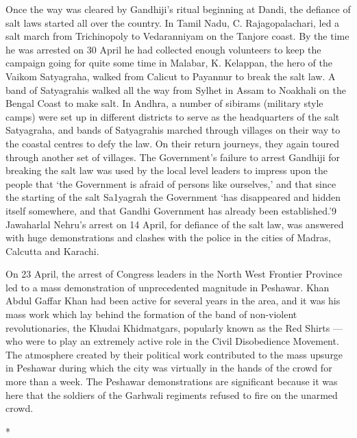Once the way was cleared by Gandhiji's ritual beginning at Dandi, the defiance of salt laws started all over the country. In Tamil Nadu, C. Rajagopalachari, led a salt march from Trichinopoly to Vedaranniyam on the Tanjore coast. By the time he was arrested on 30 April he had collected enough volunteers to keep the campaign going for quite some time in Malabar, K. Kelappan, the hero of the Vaikom Satyagraha, walked from Calicut to Payannur to break the salt law. A band of Satyagrahis walked all the way from Sylhet in Assam to Noakhali on the Bengal Coast to make salt. In Andhra, a number of sibirams (military style camps) were set up in different districts to serve as the headquarters of the salt Satyagraha, and bands of Satyagrahis marched through villages on their way to the coastal centres to defy the law. On their return journeys, they again toured through another set of villages. The Government's failure to arrest Gandhiji for breaking the salt law was used by the local level leaders to impress upon the people that `the Government is afraid of persons like ourselves,' and that since the starting of the salt Sa1yagrah the Government `has disappeared and hidden itself somewhere, and that Gandhi Government has already been established.'9 Jawaharlal Nehru's arrest on 14 April, for defiance of the salt law, was answered with huge demonstrations and clashes with the police in the cities of Madras, Calcutta and Karachi.

On 23 April, the arrest of Congress leaders in the North West Frontier Province led to a mass demonstration of unprecedented magnitude in Peshawar. Khan Abdul Gaffar Khan had been active for several years in the area, and it was his mass work which lay behind the formation of the band of non-violent revolutionaries, the Khudai Khidmatgars, popularly known as the Red Shirts --- who were to play an extremely active role in the Civil Disobedience Movement. The atmosphere created by their political work contributed to the mass upsurge in Peshawar during which the city was virtually in the hands of the crowd for more than a week. The Peshawar demonstrations are significant because it was here that the soldiers of the Garhwali regiments refused to fire on the unarmed crowd.

\begin{center}*\end{center}

